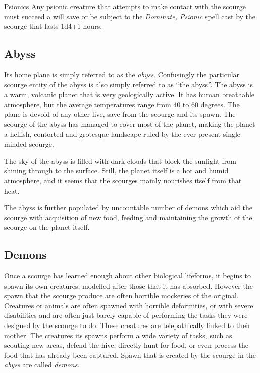 \begin{35e}{Psionics}
  Any psionic creature that attempts to make contact with the scourge must
  succeed a will save or be subject to the \emph{Dominate, Psionic} spell
  cast by the scourge that lasts 1d4+1 hours.
\end{35e}

\subsection{Abyss}
\label{sec:Abyss}

Its home plane is simply referred to as the \emph{abyss}. Confusingly the
particular scourge entity of the abyss is also simply referred to as ``the
abyss''. The abyss is a warm, volcanic planet that is very geologically
active. It has human breathable atmosphere, but the average temperatures range
from 40 to 60 degrees. The plane is devoid of any other live, save from the
scourge and its spawn. The scourge of the abyss has managed to cover most of
the planet, making the planet a hellish, contorted and grotesque landscape
ruled by the ever present single minded scourge.

The sky of the abyss is filled with dark clouds that block the sunlight from
shining through to the surface. Still, the planet itself is a hot and humid
atmosphere, and it seems that the scourges mainly nourishes itself from that
heat.

The abyss is further populated by uncountable number of demons which aid
the scourge with acquisition of new food, feeding and maintaining the growth
of the scourge on the planet itself.

\subsection{Demons}
\label{sec:Demons}

Once a scourge has learned enough about other biological lifeforms, it begins
to spawn its own creatures, modelled after those that it has absorbed.
However the spawn that the scourge produce are often horrible mockeries of the
original. Creatures or animals are often spawned with horrible deformities, or
with severe disabilities and are often just barely capable of performing the
tasks they were designed by the scourge to do. These creatures are
telepathically linked to their mother. The creatures its spawns perform a wide
variety of tasks, such as scouting new areas, defend the hive, directly hunt
for food, or even process the food that has already been captured. Spawn that
is created by the scourge in the \emph{abyss} are called \emph{demons}.

